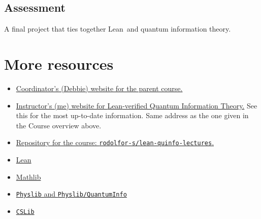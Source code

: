 \documentclass[11pt,a4paper]{article}
\newcommand{\lean}{{Lean}}
\newcommand{\mathlib}{{Mathlib}}
\begin{document}
\subsection*{Assessment}

A final project that ties together \lean\ and quantum information theory.

\section*{More resources}

\begin{itemize}
    \item \href{https://www.math.uwaterloo.ca/~wcleung/qic891-f2026.html}{Coordinator's (Debbie) website for the parent course.}
    \item \href{https://rodolfor-s.github.io/teaching/}{Instructor's (me)
    website for \lean-verified Quantum Information Theory.} See this for the
    most up-to-date information. Same address as the one given in the Course
    overview above.
    \item \href{https://github.com/rodolfor-s/lean-quinfo-lectures}{Repository for the course: \texttt{rodolfor-s/lean-quinfo-lectures}.}
    \item \href{}{\lean}
    \item \href{}{\mathlib}
    \item \href{}{\texttt{Physlib} and \texttt{Physlib/QuantumInfo}}
    \item \href{}{\texttt{CSLib}}
\end{itemize}
\end{document}
